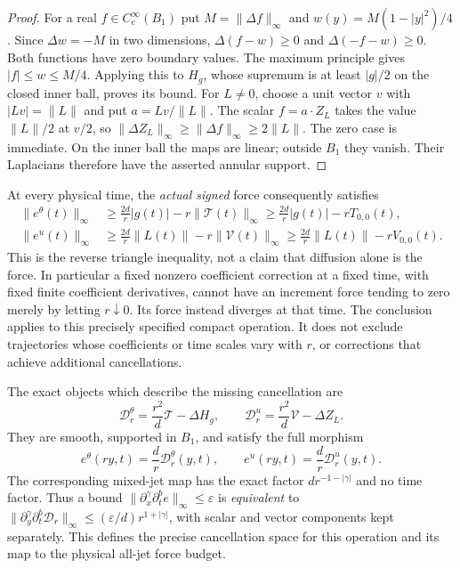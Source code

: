 \begin{proof}
For a real $f\in C_c^\infty(B_1)$ put
$M=\|\Delta f\|_\infty$ and $w(y)=M(1-|y|^2)/4$.
Since $\Delta w=-M$ in two dimensions, $\Delta(f-w)\geq0$
and $\Delta(-f-w)\geq0$.  Both functions have zero boundary
values.  The maximum principle gives $|f|\leq w\leq M/4$.
Applying this to $H_g$, whose supremum is at least $|g|/2$
on the closed inner ball, proves its bound.
For $L\ne0$, choose a unit vector $v$ with $|Lv|=\|L\|$
and put $a=Lv/\|L\|$.  The scalar $f=a\cdot Z_L$ takes
the value $\|L\|/2$ at $v/2$, so
$\|\Delta Z_L\|_\infty\geq\|\Delta f\|_\infty\geq2\|L\|$.
The zero case is immediate.  On the inner ball the maps are
linear; outside $B_1$ they vanish.  Their Laplacians therefore
have the asserted annular support.
\end{proof}

At every physical time, the \emph{actual signed} force consequently
satisfies
\begin{align}
 \|e^\theta(t)\|_\infty
 &\geq\frac{2d}{r}|g(t)|-r\|\mathcal T(t)\|_\infty
  \geq\frac{2d}{r}|g(t)|-rT_{0,0}(t),\nonumber\\
 \|e^u(t)\|_\infty
 &\geq\frac{2d}{r}\|L(t)\|-r\|\mathcal V(t)\|_\infty
  \geq\frac{2d}{r}\|L(t)\|-rV_{0,0}(t).
 \label{cvlane:ifs:force-lower-bounds}
\end{align}
This is the reverse triangle inequality, not a claim that diffusion
alone is the force.  In particular a fixed nonzero coefficient
correction at a fixed time, with fixed finite coefficient derivatives,
cannot have an increment force tending to zero merely by letting
$r\downarrow0$.  Its force instead diverges at that time.
The conclusion applies to this precisely specified compact operation.
It does not exclude trajectories whose coefficients or time scales
vary with $r$, or corrections that achieve additional cancellations.

The exact objects which describe the missing cancellation are
\begin{equation}\label{cvlane:ifs:defect-maps}
 \mathcal D^\theta_r=\frac{r^2}{d}\mathcal T-\Delta H_g,\qquad
 \mathcal D^u_r=\frac{r^2}{d}\mathcal V-\Delta Z_L.
\end{equation}
They are smooth, supported in $B_1$, and satisfy the full morphism
\[
 e^\theta(ry,t)=\frac d r\mathcal D^\theta_r(y,t),\qquad
 e^u(ry,t)=\frac d r\mathcal D^u_r(y,t).
\]
The corresponding mixed-jet map has the exact factor
$d r^{-1-|\gamma|}$ and no time factor.  Thus a bound
$\|\partial_x^\gamma\partial_t^b e\|_\infty\leq\varepsilon$
is \emph{equivalent} to
$\|\partial_y^\gamma\partial_t^b\mathcal D_r\|_\infty
\leq(\varepsilon/d)r^{1+|\gamma|}$, with scalar and vector
components kept separately.
This defines the precise cancellation space for this operation
and its map to the physical all-jet force budget.

